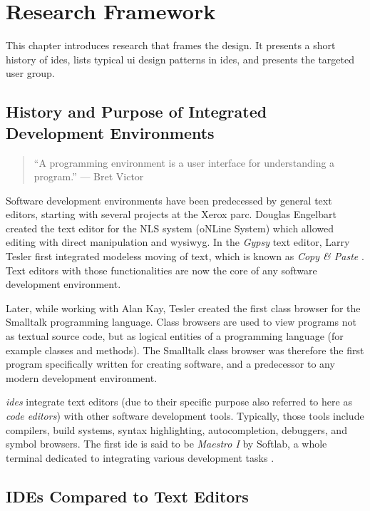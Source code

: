 \chapter{Research Framework}\label{research}

This chapter introduces research that frames the design. It presents a
short history of \glspl{ide}, lists typical \gls{ui} design patterns in
\glspl{ide}, and presents the targeted user group.

\section{History and Purpose of Integrated Development
Environments}\label{history-and-purpose-of-integrated-development-environments}

\begin{quote}
“A programming environment is a user interface for understanding a
program.” — Bret Victor \citeyear{victor}
\end{quote}

Software development environments have been predecessed by general text
editors, starting with several projects at the Xerox \gls{parc}. Douglas
Engelbart created the text editor for the NLS system (oNLine System)
which allowed editing with direct manipulation and \gls{wysiwyg}. In the
\emph{Gypsy} text editor, Larry Tesler first integrated modeless moving
of text, which is known as \emph{Copy \& Paste} \cite{moggridge}. Text
editors with those functionalities are now the core of any software
development environment.

Later, while working with Alan Kay, Tesler created the first class
browser for the Smalltalk programming language. Class browsers are used
to view programs not as textual source code, but as logical entities of
a programming language (for example classes and methods). The Smalltalk
class browser was therefore the first program specifically written for
creating software, and a predecessor to any modern development
environment.

\emph{\glspl{ide}} integrate text editors (due to their specific purpose
also referred to here as \emph{code editors}) with other software
development tools. Typically, those tools include compilers, build
systems, syntax highlighting, autocompletion, debuggers, and symbol
browsers. The first \ac{ide} is said to be \emph{Maestro I} by Softlab,
a whole terminal dedicated to integrating various development tasks
\cite{maestro}.

\section{IDEs Compared to Text
Editors}\label{ides-compared-to-text-editors}

